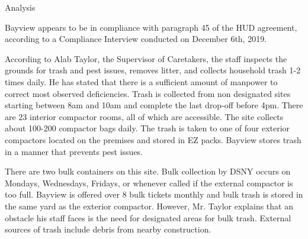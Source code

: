 Analysis

Bayview appears to be in compliance with paragraph 45 of the HUD agreement, according to a Compliance Interview conducted on December 6th, 2019. 

According to Alab Taylor, the Supervisor of Caretakers, the staff inspects the grounds for trash and pest issues, removes litter, and collects household trash 1-2 times daily. He has stated that there is a sufficient amount of manpower to correct most observed deficiencies. Trash is collected from non designated sites starting between 8am and 10am and complete the last drop-off before 4pm. There are 23 interior compactor rooms, all of which are accessible. The site collects about 100-200 compactor bags daily. The trash is taken to one of four exterior compactors located on the premises and stored in EZ packs. Bayview stores trash in a manner that prevents pest issues.

There are two bulk containers on this site. Bulk collection by DSNY occurs on Mondays, Wednesdays, Fridays, or whenever called if the external compactor is too full. Bayview is offered over 8 bulk tickets monthly and bulk trash is stored in the same yard as the exterior compactor. However, Mr. Taylor explains that an obstacle his staff faces is the need for designated areas for bulk trash. External sources of trash include debris from nearby construction. 
